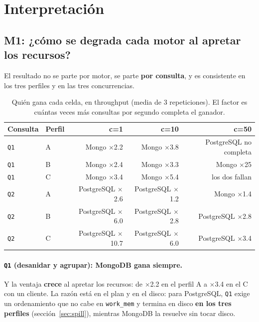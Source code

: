 
\section{Interpretación}
\label{sec:interpretacion}

\subsection{M1: ¿cómo se degrada cada motor al apretar los recursos?}
\label{sec:m1}

El resultado no se parte por motor, se parte \textbf{por consulta}, y es
consistente en los tres perfiles y en las tres concurrencias.

\begin{table}[htbp]
  \centering
  \caption{Quién gana cada celda, en throughput (media de 3 repeticiones). El
           factor es cuántas veces más consultas por segundo completa el ganador.}
  \label{tab:m1}
  \small
  \begin{tabular}{llrrr}
    \toprule
    Consulta & Perfil & c=1 & c=10 & c=50 \\
    \midrule
    \texttt{Q1} & A & Mongo $\times$2.2 & Mongo $\times$3.8 & PostgreSQL no completa\tnotaCensurada{} \\
    \texttt{Q1} & B & Mongo $\times$2.4 & Mongo $\times$3.3 & Mongo $\times$25 \\
    \texttt{Q1} & C & Mongo $\times$3.4 & Mongo $\times$5.4 & los dos fallan\tnotaColapsada{} \\
    \texttt{Q2} & A & PostgreSQL $\times$2.6 & PostgreSQL $\times$1.2 & Mongo $\times$1.4\tnotaBajaDensidad{} \\
    \texttt{Q2} & B & PostgreSQL $\times$6.0 & PostgreSQL $\times$2.8 & PostgreSQL $\times$2.8 \\
    \texttt{Q2} & C & PostgreSQL $\times$10.7 & PostgreSQL $\times$6.0 & PostgreSQL $\times$3.4 \\
    \bottomrule
  \end{tabular}
\end{table}

\paragraph{\texttt{Q1} (desanidar y agrupar): MongoDB gana siempre.}
Y la ventaja \textbf{crece} al apretar los recursos: de $\times$2.2 en el perfil A
a $\times$3.4 en el C con un cliente. La razón está en el plan y en el disco: para
PostgreSQL, \texttt{Q1} exige un ordenamiento que no cabe en \texttt{work\_mem} y
termina en disco \textbf{en los tres perfiles} (sección~\ref{sec:spill}), mientras
MongoDB la resuelve sin tocar disco.

